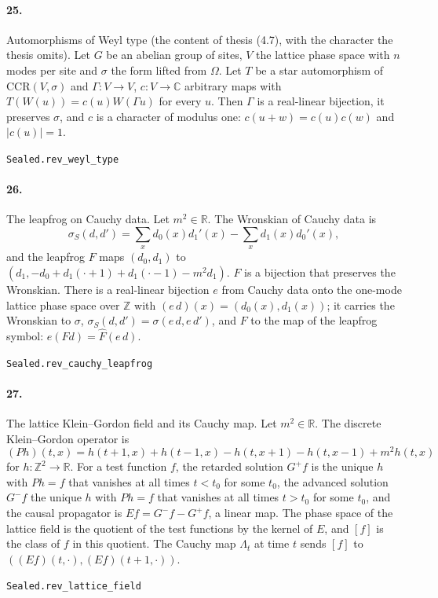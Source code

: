 \documentclass[11pt]{article}
\begin{document}
\paragraph{25.} Automorphisms of Weyl type (the content of thesis (4.7), with the character the thesis omits). Let $G$ be an abelian group of sites, $V$ the lattice phase space with $n$ modes per site and $\sigma$ the form lifted from $\Omega$. Let $T$ be a star automorphism of $\mathrm{CCR}(V, \sigma)$ and $\Gamma : V \to V$, $c : V \to \mathbb C$ arbitrary maps with $T(W(u)) = c(u) W(\Gamma u)$ for every $u$. Then $\Gamma$ is a real-linear bijection, it preserves $\sigma$, and $c$ is a character of modulus one: $c(u + w) = c(u) c(w)$ and $|c(u)| = 1$.\par{\footnotesize\texttt{Sealed.rev\_weyl\_type}}

\paragraph{26.} The leapfrog on Cauchy data. Let $m^2 \in \mathbb R$. The Wronskian of Cauchy data is \[\sigma_S(d, d') = \sum_x d_0(x) d_1'(x) - \sum_x d_1(x) d_0'(x),\] and the leapfrog $F$ maps $(d_0, d_1)$ to $(d_1, -d_0 + d_1(\cdot + 1) + d_1(\cdot - 1) - m^2 d_1)$. $F$ is a bijection that preserves the Wronskian. There is a real-linear bijection $e$ from Cauchy data onto the one-mode lattice phase space over $\mathbb Z$ with $(e\,d)(x) = (d_0(x), d_1(x))$; it carries the Wronskian to $\sigma$, $\sigma_S(d, d') = \sigma(e\,d, e\,d')$, and $F$ to the map of the leapfrog symbol: $e(F d) = \hat F (e\,d)$.\par{\footnotesize\texttt{Sealed.rev\_cauchy\_leapfrog}}

\paragraph{27.} The lattice Klein–Gordon field and its Cauchy map. Let $m^2 \in \mathbb R$. The discrete Klein–Gordon operator is \[(P h)(t, x) = h(t+1, x) + h(t-1, x) - h(t, x+1) - h(t, x-1) + m^2 h(t, x)\] for $h : \mathbb Z^2 \to \mathbb R$. For a test function $f$, the retarded solution $G^+ f$ is the unique $h$ with $P h = f$ that vanishes at all times $t < t_0$ for some $t_0$, the advanced solution $G^- f$ the unique $h$ with $P h = f$ that vanishes at all times $t > t_0$ for some $t_0$, and the causal propagator is $E f = G^- f - G^+ f$, a linear map. The phase space of the lattice field is the quotient of the test functions by the kernel of $E$, and $[f]$ is the class of $f$ in this quotient. The Cauchy map $\Lambda_t$ at time $t$ sends $[f]$ to $((E f)(t, \cdot), (E f)(t + 1, \cdot))$.\par{\footnotesize\texttt{Sealed.rev\_lattice\_field}}
\end{document}

